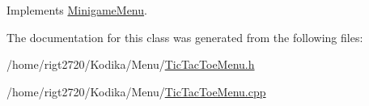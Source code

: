 Implements \hyperlink{classMinigameMenu_abde3ae319bf1660a8626c6f765e054a8}{Minigame\-Menu}.



The documentation for this class was generated from the following files\-:\begin{DoxyCompactItemize}
\item 
/home/rigt2720/\-Kodika/\-Menu/\hyperlink{TicTacToeMenu_8h}{Tic\-Tac\-Toe\-Menu.\-h}\item 
/home/rigt2720/\-Kodika/\-Menu/\hyperlink{TicTacToeMenu_8cpp}{Tic\-Tac\-Toe\-Menu.\-cpp}\end{DoxyCompactItemize}
